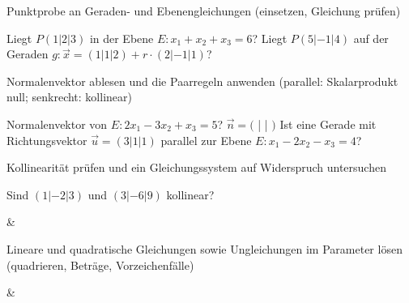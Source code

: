 \setcounter{aufgabe}{0}

\begin{aufgabe}{Punktprobe an Geraden- und Ebenengleichungen (einsetzen, Gleichung prüfen)}
\begin{teile}
\teil Liegt $P(1 | 2 | 3)$ in der Ebene $E: x_1 + x_2 + x_3 = 6$? \janein
\teil Liegt $P(5 | -1 | 4)$ auf der Geraden $g: \vec{x} = (1 | 1 | 2) + r \cdot (2 | -1 | 1)$? \janein
\end{teile}
\end{aufgabe}

\begin{aufgabe}{Normalenvektor ablesen und die Paarregeln anwenden (parallel: Skalarprodukt null; senkrecht: kollinear)}
\begin{teile}
\teil Normalenvektor von $E: 2x_1 - 3x_2 + x_3 = 5$? $\vec{n} = ($ \leerfeld | \leerfeld | \leerfeld $)$
\teil Ist eine Gerade mit Richtungsvektor $\vec{u} = (3 | 1 | 1)$ parallel zur Ebene $E: x_1 - 2x_2 - x_3 = 4$? \janein
\end{teile}
\end{aufgabe}

\begin{aufgabe}{Kollinearität prüfen und ein Gleichungssystem auf Widerspruch untersuchen}
\begin{teile}
\teil Sind $(1 | -2 | 3)$ und $(3 | -6 | 9)$ kollinear? \janein
\end{teile}
\begin{gleichungsraster}[2]
 & \\
\end{gleichungsraster}
\end{aufgabe}

\begin{aufgabe}{Lineare und quadratische Gleichungen sowie Ungleichungen im Parameter lösen (quadrieren, Beträge, Vorzeichenfälle)}
\begin{gleichungsraster}[2]
 &
 \\
\end{gleichungsraster}
\end{aufgabe}

